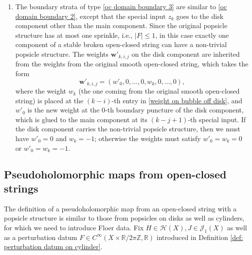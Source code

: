 \documentclass[11pt]{amsproc}
\def\Z{{\mathbb Z}}
\def\R{{\mathbb R}}
\theoremstyle{remark}
\numberwithin{equation}{section}
\begin{document}
\begin{enumerate}[label=(\roman*)]
 
\item The boundary strata of type \eqref{oc domain boundary 3} are similar to \eqref{oc domain boundary 2},
except that the special input $z_{k}$ goes to the disk component other than the main component.
Since the original popsicle structure has at most one sprinkle, i.e., $|F| \le 1$,
in this case exactly one component of a stable broken open-closed string can have a non-trivial popsicle structure.
The weights $\mathbf{w}'_{k, i, j}$ on the disk component are inherited from the weights from the original smooth open-closed string, 
which takes the form
\begin{equation}\label{weight on bubble off disk}
\mathbf{w}'_{k, i, j} = (w'_{0}, 0, \ldots, 0, w_{k}, 0, \ldots, 0),
\end{equation}
where the weight $w_{k}$ (the one coming from the original smooth open-closed string) is placed at the $(k-i)$-th entry in \eqref{weight on bubble off disk}, 
and $w'_{0}$ is the new weight at the $0$-th boundary puncture of the disk component,
which is glued to the main component at its $(k-j+1)$-th special input.
If the disk component carries the non-trivial popsicle structure,
then we must have $w'_{0}=0$ and $w_{k} = -1$;
otherwise the weights must satisfy $w'_{0}=w_{k}=0$ or $w'_{0}=w_{k}=-1$.

\end{enumerate}


\subsection{Pseudoholomorphic maps from open-closed strings}

The definition of a pseudoholomorphic map from an open-closed string with a popsicle structure is similar to those from popsicles on disks as well as cylinders, 
for which we need to introduce Floer data.
Fix $H \in \mathcal{H}(X), J \in \mathcal{J}_{1}(X)$ as well as a perturbation datum $F \in C^{\infty}(X \times \R/2\pi\Z, \R)$ introduced in Definition \ref{def: perturbation datum on cylinder}.
\end{document}
